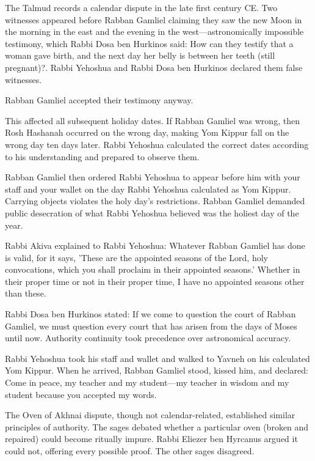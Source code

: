 The Talmud records a calendar dispute in the late first century CE. Two witnesses appeared before Rabban Gamliel claiming they saw the new Moon in the morning in the east and the evening in the west—astronomically impossible testimony, which Rabbi Dosa ben Hurkinos said: \QENOpen{}How can they testify that a woman gave birth, and the next day her belly is between her teeth (still pregnant)?\QENClose{}. Rabbi Yehoshua and Rabbi Dosa ben Hurkinos declared them false witnesses.

Rabban Gamliel accepted their testimony anyway.

This affected all subsequent holiday dates. If Rabban Gamliel was wrong, then Rosh Hashanah occurred on the wrong day, making Yom Kippur fall on the wrong day ten days later. Rabbi Yehoshua calculated the correct dates according to his understanding and prepared to observe them.

Rabban Gamliel then ordered Rabbi Yehoshua to appear before him \QENOpen{}with your staff and your wallet\QENClose{} on the day Rabbi Yehoshua calculated as Yom Kippur. Carrying objects violates the holy day's restrictions. Rabban Gamliel demanded public desecration of what Rabbi Yehoshua believed was the holiest day of the year.

Rabbi Akiva explained to Rabbi Yehoshua: \QENOpen{}Whatever Rabban Gamliel has done is valid, for it says, 'These are the appointed seasons of the Lord, holy convocations, which you shall proclaim in their appointed seasons.' Whether in their proper time or not in their proper time, I have no appointed seasons other than these.\QENClose{}

Rabbi Dosa ben Hurkinos stated: \QENOpen{}If we come to question the court of Rabban Gamliel, we must question every court that has arisen from the days of Moses until now.\QENClose{} Authority continuity took precedence over astronomical accuracy.

Rabbi Yehoshua took his staff and wallet and walked to Yavneh on his calculated Yom Kippur. When he arrived, Rabban Gamliel stood, kissed him, and declared: \QENOpen{}Come in peace, my teacher and my student—my teacher in wisdom and my student because you accepted my words.\QENClose{}

The Oven of Akhnai dispute, though not calendar-related, established similar principles of authority. The sages debated whether a particular oven (broken and repaired) could become ritually impure. Rabbi Eliezer ben Hyrcanus argued it could not, offering every possible proof. The other sages disagreed.

